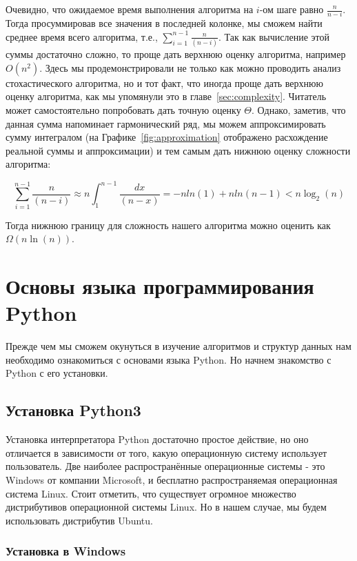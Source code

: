 Очевидно, что ожидаемое время выполнения алгоритма на $i$-ом шаге равно $\frac{n}{n-i}$.
Тогда просуммировав все значения в последней колонке, мы сможем найти среднее время всего алгоритма, 
т.е., $\sum_{i=1}^{n-1}\frac{n}{(n-i)}$. Так как вычисление этой суммы достаточно сложно, то 
проще дать верхнюю оценку алгоритма, например $O(n^2)$. Здесь мы продемонстрировали не только как можно 
проводить анализ стохастического алгоритма, но и тот факт, что иногда проще дать верхнюю оценку
алгоритма, как мы упомянули это в главе~\ref{sec:complexity}. Читатель может самостоятельно
попробовать дать точную оценку $\Theta$. Однако, заметив, что данная сумма напоминает 
гармонический ряд, мы можем аппроксимировать сумму интегралом 
(на Графике~\ref{fig:approximation} отображено расхождение реальной суммы и аппроксимации)
и тем самым дать нижнюю оценку сложности алгоритма:

$$\sum_{i=1}^{n-1}\frac{n}{(n-i)} \approx n\int_1^{n-1}\frac{dx}{(n-x)} = -nln(1)+nln(n-1) < n\log_2(n)$$

Тогда нижнюю границу для сложность нашего алгоритма можно оценить как $\Omega(n\ln(n))$.

\chapter{Основы языка программирования Python}

Прежде чем мы сможем окунуться в изучение алгоритмов и структур данных
нам необходимо ознакомиться с основами языка Python. Но начнем знакомство 
с Python с его установки.

\section{Установка Python3}

Установка интерпретатора Python достаточно простое действие, но оно отличается
в зависимости от того, какую операционную систему использует пользователь. 
Две наиболее распространённые операционные системы - это Windows от 
компании Microsoft, и бесплатно распространяемая операционная система 
Linux. Стоит отметить, что существует огромное множество дистрибутивов 
операционной системы Linux. Но в нашем случае, мы будем использовать 
дистрибутив Ubuntu.

\subsection{Установка в Windows}

